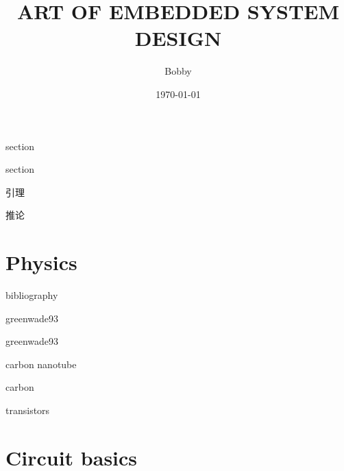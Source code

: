 \documentclass[UTF8]{ctexbook}
\title{ART OF EMBEDDED SYSTEM DESIGN }
\author{Bobby}
\date{\today}
\begin{document}
	
	\maketitle
	\frontmatter
	

	\tableofcontents
	
	
		
	\newtheorem{definition}{定义}{section}
	\newtheorem{theorem}{定理}{section}
	\newtheorem{lemma}{theorem}{引理}
	\newtheorem{corollary}{theorem}{推论}
	
	
	\mainmatter
	\part{Physics}
	\label{Physics}
	

	\begin{comment} 
	\chapter{Solid state physics}
	\label{Solid state physics}
	\chapter{Semiconductor physics}
	\label{Semiconductor physics}
	\end{comment}


	bibliography

	greenwade93\cite{greenwade93}

	greenwade93\cite{Xarticle}

	carbon nanotube\cite{dreyer2010chemistry}

	carbon\cite{geim2007rise}

	transistors\cite{novoselov2005two}






	
	
	\part{Circuit basics}
	\label{Circuit basics}
	
	
\end{document}
